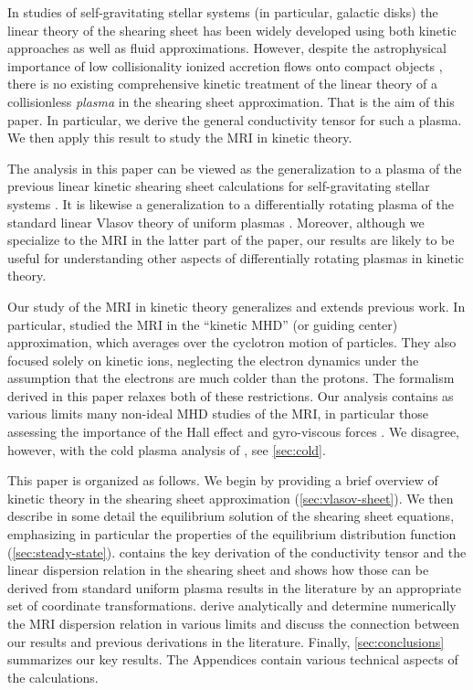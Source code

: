 \documentclass[aps,pre,notitlepage,amsmath,amssymb,amsfonts,nobibnotes,nofootinbib]{revtex4-1}
\begin{document}
In studies of self-gravitating stellar systems (in particular, galactic disks)
the linear theory of the shearing sheet has been widely developed using both
kinetic approaches as well as fluid approximations. However, despite the
astrophysical importance of low collisionality ionized accretion flows onto
compact objects \citep{Rees1982,Yuan2014}, there is no existing comprehensive
kinetic treatment of the linear theory of a collisionless \emph{plasma} in the
shearing sheet approximation. That is the aim of this paper. In particular, we
derive the general conductivity tensor for such a plasma. We then apply this
result to study the MRI in kinetic theory.

The analysis in this paper can be viewed as the generalization to a plasma of
the previous linear kinetic shearing sheet calculations for self-gravitating
stellar systems \citep[e.g.][]{Julian1966}. It is likewise a generalization to
a differentially rotating plasma of the standard linear Vlasov theory of
uniform plasmas \citep[e.g.][]{Ichimaru1973,Krall1973,Stix1992}. Moreover,
although we specialize to the MRI in the latter part of the paper, our results
are likely to be useful for understanding other aspects of differentially
rotating plasmas in kinetic theory. 

Our study of the MRI in kinetic theory generalizes and extends previous work.
In particular, \citet{Quataert2002} studied the MRI in the ``kinetic MHD'' (or
guiding center) approximation, which averages over the cyclotron motion of
particles. They also focused solely on kinetic ions, neglecting the electron
dynamics under the assumption that the electrons are much colder than the
protons. The formalism derived in this paper relaxes both of these
restrictions. Our analysis contains as various limits many non-ideal MHD
studies of the MRI, in particular those assessing the importance of the Hall
effect \citep[\cref{sec:cold-ions},][]{Wardle1999} and gyro-viscous forces
\citep[\cref{sec:gyro-viscous},][]{Ferraro2007}. We disagree, however, with
the cold plasma analysis of \citet{Krolik2006}, see \cref{sec:cold}.

This paper is organized as follows. We begin by providing a brief overview of
kinetic theory in the  shearing sheet approximation (\cref{sec:vlasov-sheet}).
We then describe in some detail the equilibrium solution of the shearing sheet
equations, emphasizing in particular the properties of the equilibrium
distribution function (\cref{sec:steady-state}).
 contains the key derivation of the conductivity
tensor and the linear dispersion relation in the shearing sheet and shows how
those can be derived from standard uniform plasma results in the literature by
an appropriate set of coordinate transformations.
 derive analytically and determine
numerically the MRI dispersion relation in various limits and discuss the
connection between our results and previous derivations in the literature.
Finally, \cref{sec:conclusions} summarizes our key results. The Appendices
contain various technical aspects of the calculations. 
\end{document}
